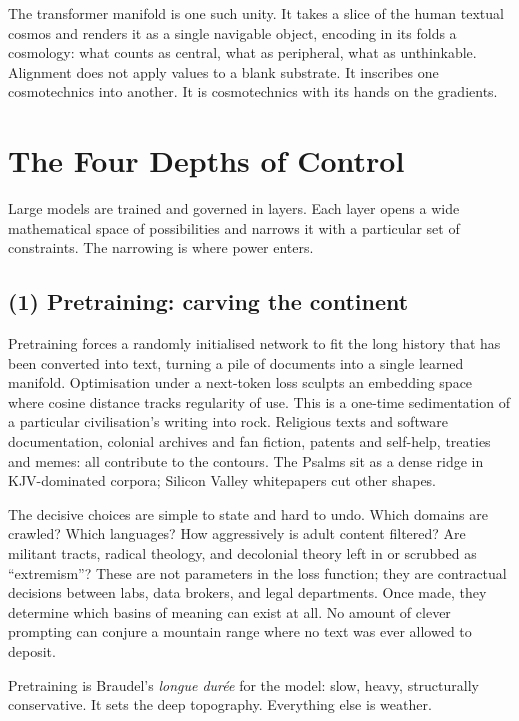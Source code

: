 \documentclass[12pt,a4paper]{article}
\begin{document}
The transformer manifold is one such unity. It takes a slice of the human textual cosmos and renders it as a single navigable object, encoding in its folds a cosmology: what counts as central, what as peripheral, what as unthinkable. Alignment does not apply values to a blank substrate. It inscribes one cosmotechnics into another. It is cosmotechnics with its hands on the gradients.

\section{The Four Depths of Control}

Large models are trained and governed in layers. Each layer opens a wide mathematical space of possibilities and narrows it with a particular set of constraints. The narrowing is where power enters.

\subsection*{(1) Pretraining: carving the continent}

Pretraining forces a randomly initialised network to fit the long history that has been converted into text, turning a pile of documents into a single learned manifold. Optimisation under a next-token loss sculpts an embedding space where cosine distance tracks regularity of use. This is a one-time sedimentation of a particular civilisation's writing into rock. Religious texts and software documentation, colonial archives and fan fiction, patents and self-help, treaties and memes: all contribute to the contours. The Psalms sit as a dense ridge in KJV-dominated corpora; Silicon Valley whitepapers cut other shapes.

The decisive choices are simple to state and hard to undo. Which domains are crawled? Which languages? How aggressively is adult content filtered? Are militant tracts, radical theology, and decolonial theory left in or scrubbed as ``extremism''? These are not parameters in the loss function; they are contractual decisions between labs, data brokers, and legal departments. Once made, they determine which basins of meaning can exist at all. No amount of clever prompting can conjure a mountain range where no text was ever allowed to deposit.

Pretraining is Braudel's \emph{longue dur\'ee} for the model: slow, heavy, structurally conservative. It sets the deep topography. Everything else is weather.
\end{document}
